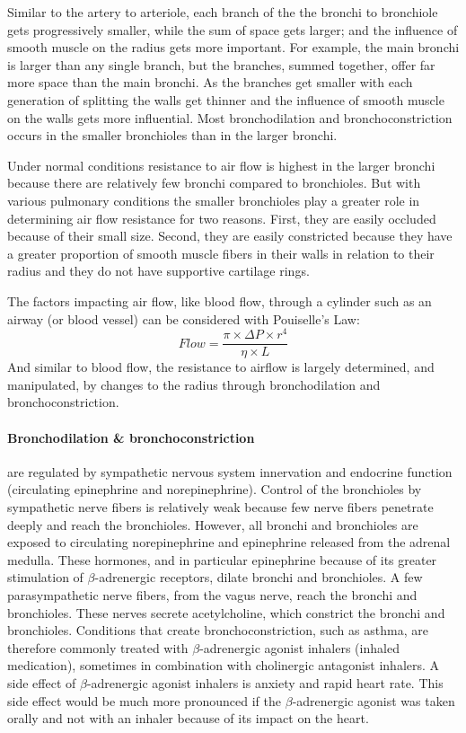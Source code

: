 Similar to the artery to arteriole, each branch of the the bronchi to bronchiole gets progressively smaller, while the sum of space gets larger; and the influence of smooth muscle on the radius gets more important. For example, the main bronchi is larger than any single branch, but the branches, summed together, offer far more space than the main bronchi. As the branches get smaller with each generation of splitting the walls get thinner and the influence of smooth muscle on the walls gets more influential. Most bronchodilation and bronchoconstriction occurs in the smaller bronchioles than in the larger bronchi.

Under normal conditions resistance to air flow is highest in the larger bronchi because there are relatively few bronchi compared to bronchioles. But with various pulmonary conditions the smaller bronchioles play a greater role in determining air flow resistance for two reasons. First, they are easily occluded because of their small size. Second, they are easily constricted because they have a greater proportion of smooth muscle fibers in their walls in relation to their radius and they do not have supportive cartilage rings.

The factors impacting air flow, like blood flow, through a cylinder such as an airway (or blood vessel) can be considered with Pouiselle's Law:
\vspace{3mm}
\begin{equation}
    Flow = \frac{\pi \times \Delta P \times r^4}{\eta \times L}
\end{equation}
\vspace{3mm}
And similar to blood flow, the resistance to airflow is largely determined, and manipulated, by changes to the radius through bronchodilation and bronchoconstriction.


\paragraph{Bronchodilation \& bronchoconstriction} are regulated by sympathetic nervous system innervation and endocrine function (circulating epinephrine and norepinephrine). Control of the bronchioles by sympathetic nerve fibers is relatively weak because few nerve fibers penetrate deeply and reach the bronchioles. However, all bronchi and bronchioles are exposed to circulating norepinephrine and epinephrine released from the adrenal medulla. These hormones, and in particular epinephrine because of its greater stimulation of $\beta$-adrenergic receptors, dilate bronchi and bronchioles. A few parasympathetic nerve fibers, from the vagus nerve, reach the bronchi and bronchioles. These nerves secrete acetylcholine, which constrict the bronchi and bronchioles. 
Conditions that create bronchoconstriction, such as asthma, are therefore commonly treated with $\beta$-adrenergic agonist inhalers (inhaled medication), sometimes in combination with cholinergic antagonist inhalers. A side effect of $\beta$-adrenergic agonist inhalers is anxiety and rapid heart rate. This side effect would be much more pronounced if the $\beta$-adrenergic agonist was taken orally and not with an inhaler because of its impact on the heart.

